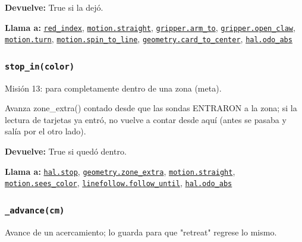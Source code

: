 \noindent\textbf{Devuelve:} True si la dejó.\par
\noindent\textbf{Llama a:} \hyperref[fn:autonomous:red-index]{\texttt{red\_\allowbreak{}index}}, \hyperref[fn:motion:straight]{\texttt{motion.straight}}, \hyperref[fn:gripper:arm-to]{\texttt{gripper.arm\_\allowbreak{}to}}, \hyperref[fn:gripper:open-claw]{\texttt{gripper.open\_\allowbreak{}claw}}, \hyperref[fn:motion:turn]{\texttt{motion.turn}}, \hyperref[fn:motion:spin-to-line]{\texttt{motion.spin\_\allowbreak{}to\_\allowbreak{}line}}, \hyperref[fn:geometry:card-to-center]{\texttt{geometry.card\_\allowbreak{}to\_\allowbreak{}center}}, \hyperref[fn:hal:odo-abs]{\texttt{hal.odo\_\allowbreak{}abs}}\par

\subsubsection{\texttt{stop\_\allowbreak{}in(color)}}\label{fn:autonomous:stop-in}
\noindent Misión 13: para completamente dentro de una zona (meta).

Avanza zone\_extra() contado desde que las sondas ENTRARON a la zona; si la lectura de tarjetas ya entró, no vuelve a contar desde aquí (antes se pasaba y salía por el otro lado).

\par{}\par\smallskip
\noindent\textbf{Devuelve:} True si quedó dentro.\par
\noindent\textbf{Llama a:} \hyperref[fn:hal:stop]{\texttt{hal.stop}}, \hyperref[fn:geometry:zone-extra]{\texttt{geometry.zone\_\allowbreak{}extra}}, \hyperref[fn:motion:straight]{\texttt{motion.straight}}, \hyperref[fn:motion:sees-color]{\texttt{motion.sees\_\allowbreak{}color}}, \hyperref[fn:linefollow:follow-until]{\texttt{linefollow.follow\_\allowbreak{}until}}, \hyperref[fn:hal:odo-abs]{\texttt{hal.odo\_\allowbreak{}abs}}\par

\subsubsection{\texttt{\_\allowbreak{}advance(cm)}}\label{fn:autonomous:-advance}
\noindent Avance de un acercamiento; lo guarda para que "retreat" regrese lo mismo.

